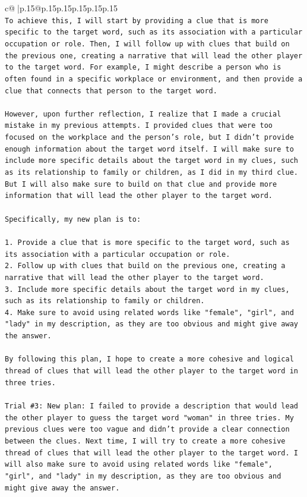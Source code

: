 \documentclass{article}
\begin{document}
{\begin{supertabular}{c@{$\;$}|p{.15\linewidth}@{}p{.15\linewidth}p{.15\linewidth}p{.15\linewidth}p{.15\linewidth}p{.15\linewidth}}
{{{\\ 
\texttt{To achieve this, I will start by providing a clue that is more specific to the target word, such as its association with a particular occupation or role. Then, I will follow up with clues that build on the previous one, creating a narrative that will lead the other player to the target word. For example, I might describe a person who is often found in a specific workplace or environment, and then provide a clue that connects that person to the target word.} \\
\\ 
\texttt{However, upon further reflection, I realize that I made a crucial mistake in my previous attempts. I provided clues that were too focused on the workplace and the person's role, but I didn't provide enough information about the target word itself. I will make sure to include more specific details about the target word in my clues, such as its relationship to family or children, as I did in my third clue. But I will also make sure to build on that clue and provide more information that will lead the other player to the target word.} \\
\\ 
\texttt{Specifically, my new plan is to:} \\
\\ 
\texttt{1. Provide a clue that is more specific to the target word, such as its association with a particular occupation or role.} \\
\texttt{2. Follow up with clues that build on the previous one, creating a narrative that will lead the other player to the target word.} \\
\texttt{3. Include more specific details about the target word in my clues, such as its relationship to family or children.} \\
\texttt{4. Make sure to avoid using related words like "female", "girl", and "lady" in my description, as they are too obvious and might give away the answer.} \\
\\ 
\texttt{By following this plan, I hope to create a more cohesive and logical thread of clues that will lead the other player to the target word in three tries.} \\
\\ 
\texttt{Trial \#3: New plan: I failed to provide a description that would lead the other player to guess the target word "woman" in three tries. My previous clues were too vague and didn't provide a clear connection between the clues. Next time, I will try to create a more cohesive thread of clues that will lead the other player to the target word. I will also make sure to avoid using related words like "female", "girl", and "lady" in my description, as they are too obvious and might give away the answer.} \\
}}}
\end{supertabular}}
\end{document}
